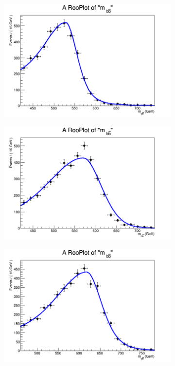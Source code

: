 \begin{figure}[phtb!]
\begin{center}
  \begin{subfigure}[$m_{A}=550$ GeV]{0.4\textwidth}\includegraphics[width=\textwidth]{FitResults/images/fitMC_bAbb550_1.png}\end{subfigure}
  \begin{subfigure}[$m_{A}=600$ GeV]{0.4\textwidth}\includegraphics[width=\textwidth]{FitResults/images/fitMC_bAbb600_1.png}\end{subfigure}
  \begin{subfigure}[$m_{A}=650$ GeV]{0.4\textwidth}\includegraphics[width=\textwidth]{FitResults/images/fitMC_bAbb650_1.png}\end{subfigure}

\end{center}
\end{figure}
